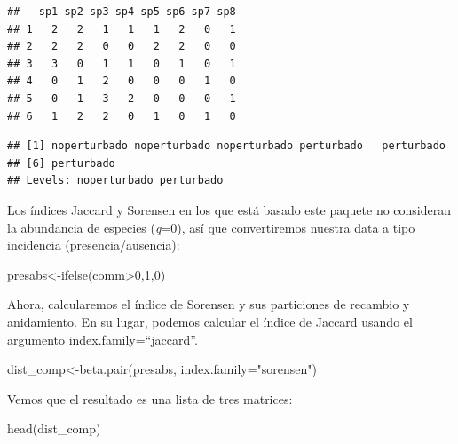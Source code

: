\documentclass[
]{article}
\newenvironment{Shaded}{\begin{snugshade}}{\end{snugshade}}
\newcommand{\AttributeTok}[1]{\textcolor[rgb]{0.77,0.63,0.00}{#1}}
\newcommand{\DecValTok}[1]{\textcolor[rgb]{0.00,0.00,0.81}{#1}}
\newcommand{\FunctionTok}[1]{\textcolor[rgb]{0.00,0.00,0.00}{#1}}
\newcommand{\NormalTok}[1]{#1}
\newcommand{\OtherTok}[1]{\textcolor[rgb]{0.56,0.35,0.01}{#1}}
\newcommand{\SpecialCharTok}[1]{\textcolor[rgb]{0.00,0.00,0.00}{#1}}
\newcommand{\StringTok}[1]{\textcolor[rgb]{0.31,0.60,0.02}{#1}}
\begin{document}
\begin{verbatim}
##   sp1 sp2 sp3 sp4 sp5 sp6 sp7 sp8
## 1   2   2   1   1   1   2   0   1
## 2   2   2   0   0   2   2   0   0
## 3   3   0   1   1   0   1   0   1
## 4   0   1   2   0   0   0   1   0
## 5   0   1   3   2   0   0   0   1
## 6   1   2   2   0   1   0   1   0
\end{verbatim}

\begin{verbatim}
## [1] noperturbado noperturbado noperturbado perturbado   perturbado  
## [6] perturbado  
## Levels: noperturbado perturbado
\end{verbatim}

Los índices Jaccard y Sorensen en los que está basado este paquete no
consideran la abundancia de especies (\emph{q}=0), así que convertiremos
nuestra data a tipo incidencia (presencia/ausencia):

\begin{Shaded}
\begin{Highlighting}[]
\NormalTok{ presabs}\OtherTok{\textless{}{-}}\FunctionTok{ifelse}\NormalTok{(comm}\SpecialCharTok{\textgreater{}}\DecValTok{0}\NormalTok{,}\DecValTok{1}\NormalTok{,}\DecValTok{0}\NormalTok{)}
\end{Highlighting}
\end{Shaded}

Ahora, calcularemos el índice de Sorensen y sus particiones de recambio
y anidamiento. En su lugar, podemos calcular el índice de Jaccard usando
el argumento index.family=``jaccard''.

\begin{Shaded}
\begin{Highlighting}[]
\NormalTok{ dist\_comp}\OtherTok{\textless{}{-}}\FunctionTok{beta.pair}\NormalTok{(presabs, }\AttributeTok{index.family=}\StringTok{"sorensen"}\NormalTok{)}
\end{Highlighting}
\end{Shaded}

Vemos que el resultado es una lista de tres matrices:

\begin{Shaded}
\begin{Highlighting}[]
\FunctionTok{head}\NormalTok{(dist\_comp)}
\end{Highlighting}
\end{Shaded}
\end{document}
